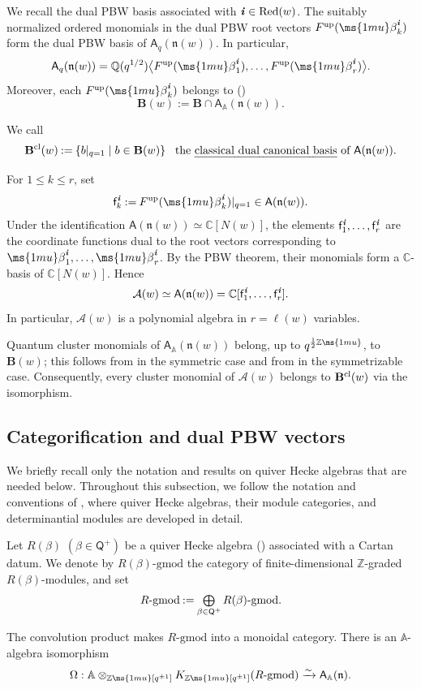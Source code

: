 \documentclass[12pt, leqno]{amsart}
\numberwithin{equation}{section}
\theoremstyle{plain}
\theoremstyle{definition}
\renewcommand{\le}{\leqslant}
\newcommand{\seteq}{\mathbin{:=}}
\newcommand{\soplus}{\mathop{\mbox{\normalsize$\bigoplus$}}\limits}
\newcommand{\gmod}{\text{-}\mathrm{gmod}}
\newcommand{\n}{\mathfrak{n}}
\newcommand{\C}{\mathbb{C}}
\newcommand{\Q}{\mathbb{Q}}
\newcommand{\Z}{\mathbb{Z}\ms{1mu}}
\newcommand{\be}{{\ms{1mu}\beta}}
\newcommand{\up}{{\rm up}}
\newcommand{\ii}{ \textbf{\textit{i}}}
\newcommand{\sfA}{\mathsf{A}}
\newcommand{\sfQ}{\mathsf{Q}}
\newcommand{\sff}{\mathsf{f}}
\newcommand{\bbA}{\mathbb{A}}
\newcommand{\bfB}{\mathbf{B}}
\newcommand{\calA}{\mathcal{A}}
\newcommand{\Red}{\mathrm{Red}}
\begin{document}
We recall the dual PBW basis associated with
$\ii\in\Red(w)$. The  suitably normalized {}ordered monomials in the dual PBW root vectors
$F^{\up}(\be_k^\ii)$ form the dual PBW basis of
$\sfA_q(\n(w))$. In particular,
\[
\sfA_q(\n(w)) = \Q(q^{1/2}) \bigl\langle F^{\up}(\be_1^\ii),\ldots,F^{\up}(\be_r^\ii) \bigr\rangle .
\]
Moreover, each $F^{\up}(\be_k^\ii)$ belongs to (\cite[Proposition~4.23]{Kimura12})
\[
\bfB(w)\seteq \bfB\cap\sfA_\bbA(\n(w)).
\]


We call
\[
\bfB^{\rm cl}(w) \seteq \left\{ b|_{q=1}\mid b\in\bfB(w) \right\} \ \ \text{the \emph{classical dual canonical basis} of $\sfA(\n(w))$.}
\]

For $1\le k\le r$, set
\[
\sff_k^\ii \seteq F^{\up}(\be_k^\ii)|_{q=1} \in \sfA(\n(w)).
\]
Under the identification  $\sfA(\n(w))\simeq\C[N(w)]$,
the elements $\sff_1^\ii,\ldots,\sff_r^\ii$ are the coordinate functions
dual to the root vectors corresponding to
$\be_1^\ii,\ldots,\be_r^\ii$.  By the PBW theorem, their monomials
form a $\C$-basis of $\C[N(w)]$.  Hence
\[
\calA(w) \simeq \sfA(\n(w)) = \C[\sff_1^\ii,\ldots,\sff_r^\ii].
\]
In particular, $\calA(w)$ is a polynomial algebra in $r=\ell(w)$ variables.

Quantum cluster monomials of $\sfA_\bbA(\n(w))$ belong, up to $q^{\frac{1}{2}\Z}$,  to $\bfB(w)$; this follows from \cite{KKKO18}
in the symmetric case and from \cite{Qin20} in the symmetrizable case. Consequently, every cluster monomial of $\calA(w)$ belongs
to $\bfB^{\rm cl}(w)$ via the isomorphism.

\subsection{Categorification and dual PBW vectors} \label{subsec: PBW}

We briefly recall only the notation and results on quiver Hecke
algebras that are needed below.  Throughout this subsection, we follow
the notation and conventions of \cite{KKKO18,KKOP18}, where quiver
Hecke algebras, their module categories, and determinantial modules
are developed in detail.

\smallskip

Let $R(\beta)$ $(\beta\in\sfQ^+)$ be a quiver Hecke algebra
(\cite{KL1,KL2,R08}) associated with a Cartan datum.
We denote by $R(\beta)\gmod$ the category of finite-dimensional
$\mathbb Z$-graded $R(\beta)$-modules, and set
\[
R\gmod \seteq \soplus_{\beta\in\sfQ^+} R(\beta)\gmod.
\]

The convolution product makes $R\gmod$ into a monoidal category.
There is an $\bbA$-algebra isomorphism \cite{KL1,KL2,R08}
\[
\Omega: \bbA\otimes_{\Z[q^{\pm1}]} K_{\Z[q^{\pm1}]}(R\gmod) \xrightarrow{\sim} \sfA_\bbA(\n).
\]
\end{document}
